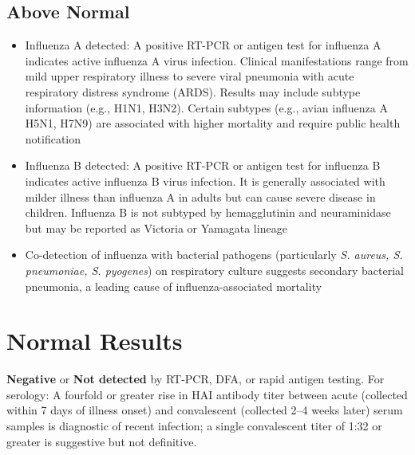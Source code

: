 \subsection*{Above Normal}
\begin{itemize}
  \item Influenza A detected: A positive RT-PCR or antigen test for influenza A indicates active influenza A virus infection. Clinical manifestations range from mild upper respiratory illness to severe viral pneumonia with acute respiratory distress syndrome (ARDS). Results may include subtype information (e.g., H1N1, H3N2). Certain subtypes (e.g., avian influenza A H5N1, H7N9) are associated with higher mortality and require public health notification
  \item Influenza B detected: A positive RT-PCR or antigen test for influenza B indicates active influenza B virus infection. It is generally associated with milder illness than influenza A in adults but can cause severe disease in children. Influenza B is not subtyped by hemagglutinin and neuraminidase but may be reported as Victoria or Yamagata lineage
  \item Co-detection of influenza with bacterial pathogens (particularly \textit{S. aureus, S. pneumoniae, S. pyogenes}) on respiratory culture suggests secondary bacterial pneumonia, a leading cause of influenza-associated mortality
\end{itemize}

\section*{Normal Results}
\textbf{Negative} or \textbf{Not detected} by RT-PCR, DFA, or rapid antigen testing. For serology: A fourfold or greater rise in HAI antibody titer between acute (collected within 7 days of illness onset) and convalescent (collected 2--4 weeks later) serum samples is diagnostic of recent infection; a single convalescent titer of 1:32 or greater is suggestive but not definitive.

